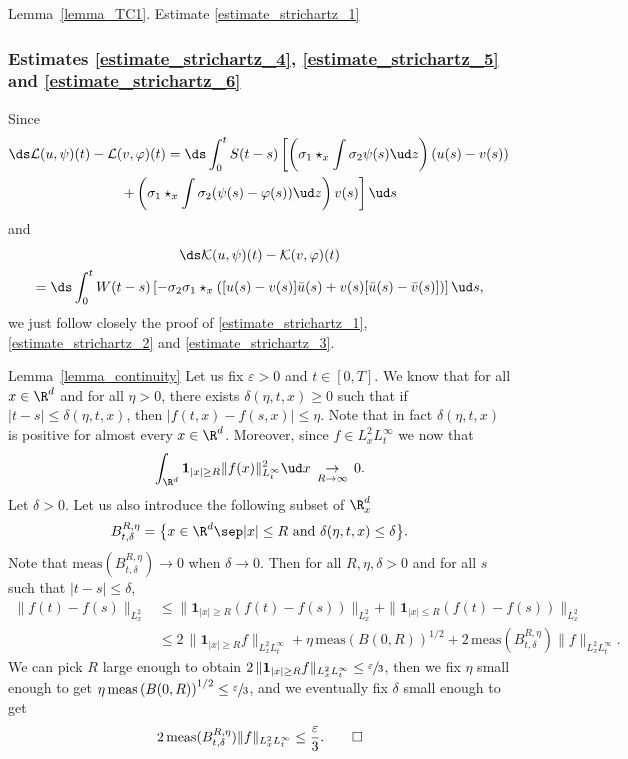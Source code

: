 \begin{ProofOf}{Lemma~\ref{lemma_TC1}. Estimate \eqref{estimate_strichartz_1}}
\subsubsection*{Estimates \eqref{estimate_strichartz_4}, \eqref{estimate_strichartz_5} and \eqref{estimate_strichartz_6}} Since\vspace*{-5pt}
\begin{multline*}
\ds\mathcal{L}(u,\psi)(t)-\mathcal{L}(v,\varphi)(t)
= \ds\int_{0}^{t}S(t-s)\left[\left(\sigma_{1}\star_{x}\int\sigma_{2}\psi(s)\ud z\right)(u(s)-v(s))
\right.
\\
\left.+\left(\sigma_{1}\star_{x}\int\sigma_{2}(\psi(s)-\varphi(s))\ud z\right)v(s)\right]\ud s
\end{multline*}\vspace*{-5pt}
and
\begin{multline*}
\ds\mathcal{K}(u,\psi)(t)-\mathcal{K}(v,\varphi)(t)\\
= \ds\int_{0}^{t}W(t-s)\left[-\sigma_{2}\sigma_{1}\star_{x}\left([u(s)-v(s)]\bar{u}(s)+v(s)[\bar{u}(s)-\bar{v}(s)]\right)\right]\ud s,
\end{multline*}
we just follow closely the proof of \eqref{estimate_strichartz_1}, \eqref{estimate_strichartz_2} and \eqref{estimate_strichartz_3}.
\end{ProofOf}

\begin{ProofOf}{Lemma~\ref{lemma_continuity}}
Let us fix $\varepsilon>0$ and $t\in[0,T]$. We know that for all $x\in\R^{d}$ and for all $\eta>0$, there exists $\delta(\eta,t,x)\geq 0$ such that if $|t-s|\leq\delta(\eta,t,x)$, then $|f(t,x)-f(s,x)|\leq\eta$. Note that in fact $\delta(\eta,t,x)$ is positive
for almost every $x\in\R^{d}$. Moreover, since $f\in L_{x}^{2}L_{t}^{\infty}$ we now that
\[
\int_{\R^{d}}\mathbf{1}_{|x|\geq R}\|f(x)\|_{L_{t}^{\infty}}^{2}\ud x\,\underset{R\to \infty}{\to}\,0.
\]
Let $\delta>0$. Let us also introduce the following subset of $\R_{x}^{d}$
\[
B_{t,\delta}^{R,\eta}=\bigl\{x\in\R^{d}\sep |x|\leq R \text{ and } \delta(\eta,t,x)
\leq\delta\bigr\}.
\]
Note that $\mathrm{meas}(B_{t,\delta}^{R,\eta})\to 0$ when $\delta\to 0$. Then for all $R,\eta,\delta>0$ and for all $s$ such that $|t-s|\leq\delta$,
\begin{align*}
\|f(t)-f(s)\|_{L_{x}^{2}}&\leq\|\mathbf{1}_{|x|\geq R}(f(t)-f(s))\|_{L_{x}^{2}}+\|\mathbf{1}_{|x|\leq R}(f(t)-f(s))\|_{L_{x}^{2}}\\
&\leq 2\,\|\mathbf{1}_{|x|\geq R}f\|_{L_{x}^{2}L_{t}^{\infty}}+\eta\,\mathrm{meas}\left(B(0,R)\right)^{1/2}+2\,\mathrm{meas}(B_{t,\delta}^{R,\eta})\|f\|_{L_{x}^{2}L_{t}^{\infty}}.
\end{align*}
We can pick $R$ large enough to obtain
$
2\,\|\mathbf{1}_{|x|\geq R}f\|_{L_{x}^{2}L_{t}^{\infty}}\leq\sfrac{\varepsilon}{3}$, then we fix $\eta$ small enough to get
$\eta\,\mathrm{meas}\left(B(0,R)\right)^{1/2}\leq\sfrac{\varepsilon}{3}$, and we eventually fix $\delta$ small enough to get
\[
2\,\mathrm{meas}(B_{t,\delta}^{R,\eta})\|f\|_{L_{x}^{2}L_{t}^{\infty}}\leq\frac{\varepsilon}{3}.\qedhere
\]
\end{ProofOf}

